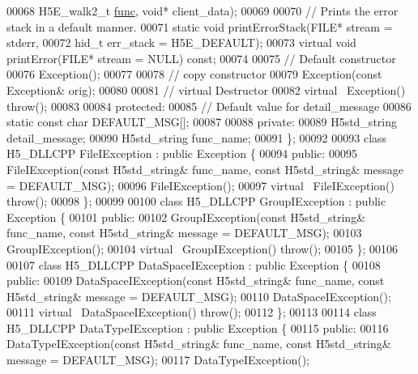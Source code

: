 \begin{DoxyCode}
00068                                    H5E\_walk2\_t \hyperlink{structfunc}{func}, \textcolor{keywordtype}{void}* client\_data);
00069 
00070         \textcolor{comment}{// Prints the error stack in a default manner.}
00071         \textcolor{keyword}{static} \textcolor{keywordtype}{void} printErrorStack(FILE* stream = stderr,
00072                                     hid\_t err\_stack = H5E\_DEFAULT);
00073         \textcolor{keyword}{virtual} \textcolor{keywordtype}{void} printError(FILE* stream = NULL) \textcolor{keyword}{const};
00074 
00075         \textcolor{comment}{// Default constructor}
00076         Exception();
00077 
00078         \textcolor{comment}{// copy constructor}
00079         Exception(\textcolor{keyword}{const} Exception& orig);
00080 
00081         \textcolor{comment}{// virtual Destructor}
00082         \textcolor{keyword}{virtual} ~Exception() throw();
00083 
00084    protected:
00085         \textcolor{comment}{// Default value for detail\_message}
00086         static const \textcolor{keywordtype}{char} DEFAULT\_MSG[];
00087 
00088    private:
00089         H5std\_string detail\_message;
00090         H5std\_string func\_name;
00091 \};
00092 
00093 class H5\_DLLCPP FileIException : public Exception \{
00094    \textcolor{keyword}{public}:
00095         FileIException(\textcolor{keyword}{const} H5std\_string& func\_name, \textcolor{keyword}{const} H5std\_string& message = DEFAULT\_MSG);
00096         FileIException();
00097         \textcolor{keyword}{virtual} ~FileIException() throw();
00098 \};
00099 
00100 class H5\_DLLCPP GroupIException : public Exception \{
00101    \textcolor{keyword}{public}:
00102         GroupIException(\textcolor{keyword}{const} H5std\_string& func\_name, \textcolor{keyword}{const} H5std\_string& message = DEFAULT\_MSG);
00103         GroupIException();
00104         \textcolor{keyword}{virtual} ~GroupIException() throw();
00105 \};
00106 
00107 class H5\_DLLCPP DataSpaceIException : public Exception \{
00108    \textcolor{keyword}{public}:
00109         DataSpaceIException(\textcolor{keyword}{const} H5std\_string& func\_name, \textcolor{keyword}{const} H5std\_string& message = DEFAULT\_MSG);
00110         DataSpaceIException();
00111         \textcolor{keyword}{virtual} ~DataSpaceIException() throw();
00112 \};
00113 
00114 class H5\_DLLCPP DataTypeIException : public Exception \{
00115    \textcolor{keyword}{public}:
00116         DataTypeIException(\textcolor{keyword}{const} H5std\_string& func\_name, \textcolor{keyword}{const} H5std\_string& message = DEFAULT\_MSG);
00117         DataTypeIException();

\end{DoxyCode}
